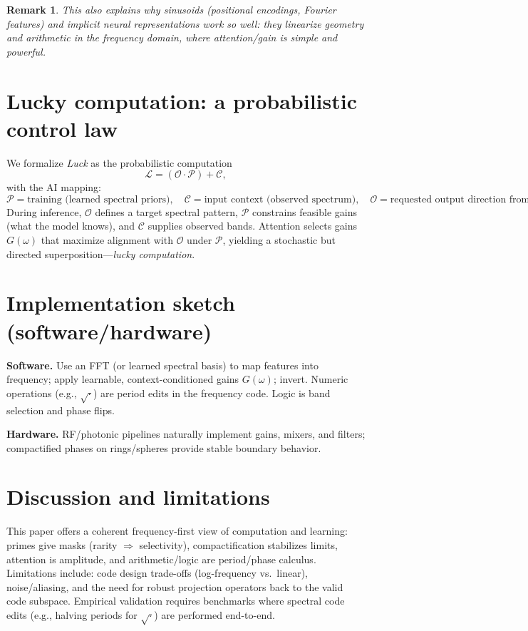 \documentclass[12pt]{article}
\newtheorem{remark}{Remark}
\newcommand{\Luck}{\mathcal{L}}
\newcommand{\Opp}{\mathcal{O}}
\newcommand{\Prep}{\mathcal{P}}
\newcommand{\Circ}{\mathcal{C}}
\begin{document}
\begin{remark}
This also explains why sinusoids (positional encodings, Fourier features) and implicit neural representations work so well: they linearize geometry and arithmetic in the frequency domain, where attention/gain is simple and powerful.
\end{remark}

\section{Lucky computation: a probabilistic control law}
We formalize \emph{Luck} as the probabilistic computation
\[
\Luck = (\Opp\cdot \Prep) + \Circ,
\]
with the AI mapping:
\[
\Prep=\text{training (learned spectral priors)},\quad
\Circ=\text{input context (observed spectrum)},\quad
\Opp=\text{requested output direction from input (task prompt/objective)}.
\]
During inference, $\Opp$ defines a target spectral pattern, $\Prep$ constrains feasible gains (what the model knows), and $\Circ$ supplies observed bands. Attention selects gains $G(\omega)$ that maximize alignment with $\Opp$ under $\Prep$, yielding a stochastic but directed superposition—\emph{lucky computation}.

\section{Implementation sketch (software/hardware)}
\textbf{Software.} Use an FFT (or learned spectral basis) to map features into frequency; apply learnable, context-conditioned gains $G(\omega)$; invert. Numeric operations (e.g., $\sqrt{\cdot}$) are period edits in the frequency code. Logic is band selection and phase flips.

\textbf{Hardware.} RF/photonic pipelines naturally implement gains, mixers, and filters; compactified phases on rings/spheres provide stable boundary behavior.

\section{Discussion and limitations}
This paper offers a coherent frequency-first view of computation and learning: primes give masks (rarity $\Rightarrow$ selectivity), compactification stabilizes limits, attention is amplitude, and arithmetic/logic are period/phase calculus. Limitations include: code design trade-offs (log-frequency vs.\ linear), noise/aliasing, and the need for robust projection operators back to the valid code subspace. Empirical validation requires benchmarks where spectral code edits (e.g., halving periods for $\sqrt{\cdot}$) are performed end-to-end.
\end{document}
